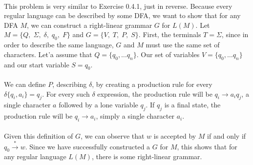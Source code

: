 \documentclass[12pt]{article}
\begin{document}
\begin{itemize}
\begin{enumerate}
\\
This problem is very similar to Exercise 0.4.1, just in reverse. Because every regular language can be described by some DFA, we want to show that for any DFA $M$, we can construct a right-linear grammar $G$ for $L(M)$. Let $M = \{Q,\;\Sigma,\;\delta,\;q_0,\;F\}$ and $G =\{V,\;T,\;P,\;S\}$. First, the terminals $T = \Sigma$, since in order to describe the same language, $G$ and $M$ must use the same set of characters. Let'a assume that $Q = \{q_0,\dots q_n\}$. Our set of variables $V = \{q_0,\dots q_n\}$ and our start variable $S = q_0$. \\
\\
We can define $P$, describing $\delta$, by creating a production rule for every $\delta\{q_i, a_i\} = q_j$. For every such $\delta$ expression, the production rule will be $q_i \rightarrow a_iq_j$, a single character $a$ followed by a lone variable $q_j$. If $q_j$ is a final state, the production rule will be $q_i \rightarrow a_i$, simply a single character $a_i$. \\
\\
Given this definition of $G$, we can observe that $w$ is accepted by $M$ if and only if $q_0 \xrightarrow{\ast} w$. Since we have successfully constructed a $G$ for $M$, this shows that for any regular language $L(M)$, there is some right-linear grammar. \\
\end{enumerate}

\end{itemize}
\end{document}
